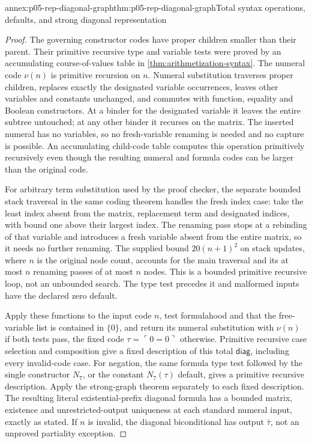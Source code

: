 \begin{annexitem}{annex:p05-rep-diagonal-graph}{thm:p05-rep-diagonal-graph}{Total syntax operations, defaults, and strong diagonal representation}
\begin{proof}
The governing constructor codes have proper children smaller than their
parent. Their primitive recursive type and variable tests were proved by
an accumulating course-of-values table in
\cref{thm:arithmetization-syntax}. The numeral code \(\nu(n)\) is
primitive recursion on \(n\). Numeral substitution traverses proper
children, replaces exactly the designated variable occurrences, leaves
other variables and constants unchanged, and commutes with function,
equality and Boolean constructors. At a binder for the designated
variable it leaves the entire subtree untouched; at any other binder it
recurses on the matrix. The inserted numeral has no variables, so no
fresh-variable renaming is needed and no capture is possible. An
accumulating child-code table computes this operation primitively
recursively even though the resulting numeral and formula codes can be
larger than the original code.

For arbitrary term substitution used by the proof checker, the separate
bounded stack traversal in the same coding theorem handles the fresh
index case: take the least index absent from the matrix, replacement
term and designated indices, with bound one above their largest index.
The renaming pass stops at a rebinding of that variable and introduces a
fresh variable absent from the entire matrix, so it needs no further
renaming. The supplied bound \(20(n+1)^2\) on stack updates, where
\(n\) is the original node count, accounts for the main traversal and
its at most \(n\) renaming passes of at most \(n\) nodes. This is a
bounded primitive recursive loop, not an unbounded search. The type test
precedes it and malformed inputs have the declared zero default.

Apply these functions to the input code \(n\), test formulahood and that
the free-variable list is contained in \(\{0\}\), and return its numeral
substitution with \(\nu(n)\) if both tests pass, the fixed code
\(\tau=\ulcorner0=0\urcorner\) otherwise.
Primitive recursive case selection and composition give a fixed
description of this total \(\mathsf{diag}\), including every invalid-code
case. For negation, the same formula type test followed by the single
constructor \(N_7\), or the constant \(N_7(\tau)\) default, gives a primitive recursive
description. Apply the strong-graph theorem separately to each fixed
description. The resulting literal existential-prefix diagonal formula
has a bounded matrix, existence and unrestricted-output uniqueness at
each standard numeral input, exactly as stated. If \(n\) is invalid,
the diagonal biconditional has output \(\bar\tau\), not an unproved partiality exception.
\end{proof}
\end{annexitem}

